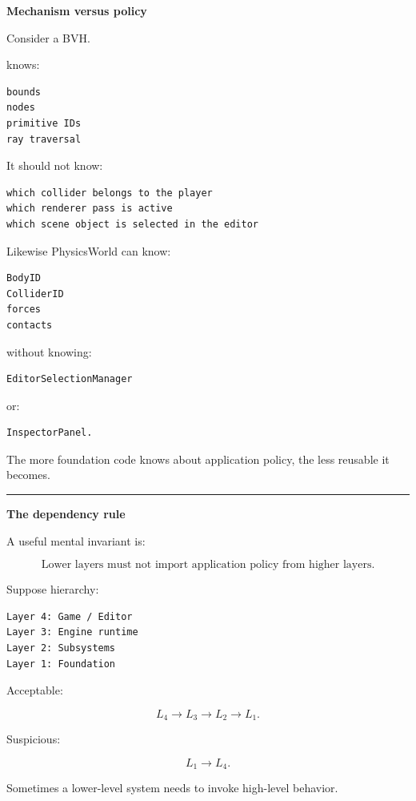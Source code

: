 \textbf{Mechanism versus policy}

Consider a BVH.

 knows:

\begin{verbatim}
bounds
nodes
primitive IDs
ray traversal
\end{verbatim}

It should not know:

\begin{verbatim}
which collider belongs to the player
which renderer pass is active
which scene object is selected in the editor
\end{verbatim}

Likewise PhysicsWorld can know:

\begin{verbatim}
BodyID
ColliderID
forces
contacts
\end{verbatim}

without knowing:

\begin{verbatim}
EditorSelectionManager
\end{verbatim}

or:

\begin{verbatim}
InspectorPanel.
\end{verbatim}

The more foundation code knows about application policy, the less reusable it becomes.

\begin{center}\rule{0.5\linewidth}{0.5pt}\end{center}

\textbf{The dependency rule}

A useful mental invariant is:

\[
\boxed{
\text{Lower layers must not import application policy from higher layers.}
}
\]

Suppose hierarchy:

\begin{verbatim}
Layer 4: Game / Editor
Layer 3: Engine runtime
Layer 2: Subsystems
Layer 1: Foundation
\end{verbatim}

Acceptable:

\[
L_4\rightarrow L_3\rightarrow L_2\rightarrow L_1.
\]

Suspicious:

\[
L_1\rightarrow L_4.
\]

Sometimes a lower-level system needs to invoke high-level behavior.

